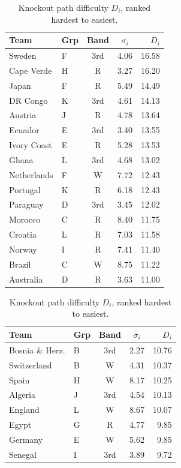 \documentclass[11pt]{article}
\newcommand{\Dif}{D}                 %
\newcommand{\str}{\sigma}            %
\begin{document}
\begin{table}[htbp]
\centering
\caption{Knockout path difficulty $\Dif_i$, ranked hardest to easiest.}
\label{tab:D}
\begin{minipage}{0.48\textwidth}\centering
\begin{tabular}[t]{@{}llccr@{}}
\toprule
Team & Grp & Band & $\str_i$ & $\Dif_i$ \\
\midrule
Sweden & F & 3rd & 4.06 & 16.58 \\
Cape Verde & H & R & 3.27 & 16.20 \\
Japan & F & R & 5.49 & 14.49 \\
DR Congo & K & 3rd & 4.61 & 14.13 \\
Austria & J & R & 4.78 & 13.64 \\
Ecuador & E & 3rd & 3.40 & 13.55 \\
Ivory Coast & E & R & 5.28 & 13.53 \\
Ghana & L & 3rd & 4.68 & 13.02 \\
Netherlands & F & W & 7.72 & 12.43 \\
Portugal & K & R & 6.18 & 12.43 \\
Paraguay & D & 3rd & 3.45 & 12.02 \\
Morocco & C & R & 8.40 & 11.75 \\
Croatia & L & R & 7.03 & 11.58 \\
Norway & I & R & 7.41 & 11.40 \\
Brazil & C & W & 8.75 & 11.22 \\
Australia & D & R & 3.63 & 11.00 \\
\bottomrule
\end{tabular}
\end{minipage}\hfill\begin{minipage}{0.48\textwidth}\centering
\begin{tabular}[t]{@{}llccr@{}}
\toprule
Team & Grp & Band & $\str_i$ & $\Dif_i$ \\
\midrule
Bosnia \& Herz. & B & 3rd & 2.27 & 10.76 \\
Switzerland & B & W & 4.31 & 10.37 \\
Spain & H & W & 8.17 & 10.25 \\
Algeria & J & 3rd & 4.54 & 10.13 \\
England & L & W & 8.67 & 10.07 \\
Egypt & G & R & 4.77 & 9.85 \\
Germany & E & W & 5.62 & 9.85 \\
Senegal & I & 3rd & 3.89 & 9.72 \\

\end{tabular}
\end{minipage}
\end{table}
\end{document}
